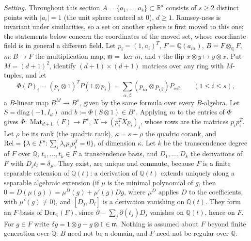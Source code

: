 \documentclass[11pt]{amsart}
\newcommand{\Q}{\mathbb{Q}}
\newcommand{\R}{\mathbb{R}}
\DeclareMathOperator{\Mat}{Mat}
\theoremstyle{plain}
\theoremstyle{definition}
\begin{document}
\medskip\noindent\emph{Setting.} Throughout this section $A=\{a_1,\dots,a_s\}\subset\R^d$ consists of
$s\ge2$ distinct points with $|a_i|=1$ (the unit sphere centred at $0$), $d\ge1$. Ramsey-ness is invariant
under similarities, so a set on another sphere is first moved to this one; the statements below concern
the coordinates of the moved set, whose coordinate field is in general a different field. Let
$p_i=(1,a_i)^T$, $F=\Q(a_{i\alpha})$, $B=F\otimes_\Q F$, $m:B\to F$ the multiplication map,
$\mathfrak m=\ker m$, and $\tau$ the flip $x\otimes y\mapsto y\otimes x$. Put $M=(d+1)^2$, identify
$(d+1)\times(d+1)$ matrices over any ring with $M$-tuples, and let
\[
 \Phi(P)_i=(p_i\otimes1)^TP(1\otimes p_i)=\sum_{\alpha,\beta}(p_{i\alpha}\otimes p_{i\beta})P_{\alpha\beta}
 \qquad(1\le i\le s),
\]
a $B$-linear map $B^M\to B^s$, given by the same formula over every $B$-algebra. Let
$S=\mathrm{diag}(-1,I_d)$ and $b:=\Phi(S\otimes1)\in B^s$. Applying $m$ to the entries of $\Phi$ gives
$\bar\Phi:\Mat_{d+1}(F)\to F^s$, $X\mapsto(p_i^TXp_i)_i$, whose rows are the matrices $p_ip_i^T$. Let
$\rho$ be its rank (the quadric rank), $\kappa=s-\rho$ the quadric corank, and
$\mathrm{Rel}=\{\lambda\in F^s:\sum_i\lambda_ip_ip_i^T=0\}$, of dimension $\kappa$. Let $k$ be the
transcendence degree of $F$ over $\Q$, $t_1,\dots,t_k\in F$ a transcendence basis, and $D_1,\dots,D_k$
the derivations of $F$ with $D_jt_l=\delta_{jl}$. They exist, are unique and commute, because $F$ is a finite
separable extension of $\Q(t)$: a derivation of $\Q(t)$ extends uniquely along a separable algebraic
extension (if $\mu$ is the minimal polynomial of $g$, then $0=D(\mu(g))=\mu^D(g)+\mu'(g)Dg$, where $\mu^D$ applies $D$ to the coefficients, with
$\mu'(g)\ne0$), and $[D_j,D_l]$ is a derivation vanishing on $\Q(t)$. They form an $F$-basis of
$\mathrm{Der}_\Q(F)$, since $\partial-\sum_j\partial(t_j)D_j$ vanishes on $\Q(t)$, hence on $F$. For
$g\in F$ write $\delta g=1\otimes g-g\otimes1\in\mathfrak m$. Nothing is assumed about $F$ beyond finite
generation over $\Q$: $B$ need not be a domain, and $F$ need not be regular over $\Q$.
\end{document}
